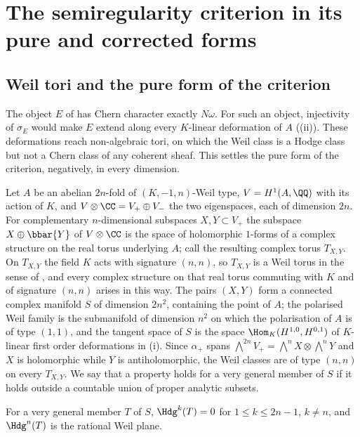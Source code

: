\section{The semiregularity criterion in its pure and corrected forms}\label{sec:corrected}

\subsection{Weil tori and the pure form of the criterion}

The object $E$ of  has Chern character exactly
$N\omega$. For such an object, injectivity of $\sigma_{E}$ would make $E$
extend along every $K$-linear deformation of $A$ ((ii)). These
deformations reach non-algebraic tori, on which the Weil class is a Hodge
class but not a Chern class of any coherent sheaf. This settles the pure form
of the criterion, negatively, in every dimension.

\begin{setupenv}\label{setup:weiltori}
Let $A$ be an abelian $2n$-fold of $(K,-1,n)$-Weil type, $V=H^{1}(A,\QQ)$ with
its action of $K$, and $V\otimes\CC=V_{+}\oplus V_{-}$ the two eigenspaces,
each of dimension $2n$. For complementary $n$-dimensional subspaces
$X,Y\subset V_{+}$ the subspace $X\oplus\bbar{Y}$ of $V\otimes\CC$ is the
space of holomorphic $1$-forms of a complex structure on the real torus
underlying $A$; call the resulting complex torus $T_{X,Y}$. On $T_{X,Y}$ the
field $K$ acts with signature $(n,n)$, so $T_{X,Y}$ is a Weil torus in the
sense of \cite{Voi02b}, and every complex structure on that real torus
commuting with $K$ and of signature $(n,n)$ arises in this way. The pairs
$(X,Y)$ form a connected complex manifold $S$ of dimension $2n^{2}$,
containing the point of $A$; the polarised Weil family is the submanifold of
dimension $n^{2}$ on which the polarisation of $A$ is of type $(1,1)$, and the
tangent space of $S$ is the space $\Hom_{K}(H^{1,0},H^{0,1})$ of $K$-linear
first order deformations in (i). Since
$\alpha_{+}$ spans $\bigwedge^{2n}V_{+}=\bigwedge^{n}X\otimes\bigwedge^{n}Y$
and $X$ is holomorphic while $Y$ is antiholomorphic, the Weil classes are of
type $(n,n)$ on every $T_{X,Y}$. We say that a property holds for a very
general member of $S$ if it holds outside a countable union of proper
analytic subsets.
\end{setupenv}

\begin{lemma}
\label{lem:weiltorushodge}
For a very general member $T$ of $S$, $\Hdg^{k}(T)=0$ for
$1\le k\le2n-1$, $k\ne n$, and $\Hdg^{n}(T)$ is the rational Weil plane.
\end{lemma}

